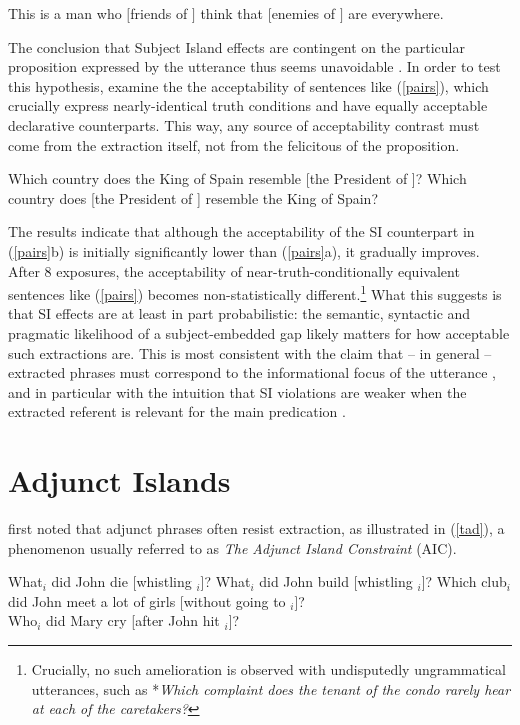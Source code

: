 \documentclass[output=paper]{langsci/langscibook}
\begin{document}
\ea
 This is a man who $[$friends of \spcs $]$
 think that $[$enemies of \spcs $]$ are everywhere.
 \z \label{symbd}

The conclusion that Subject Island effects are contingent on the particular proposition expressed by the utterance thus seems unavoidable \citep{chavesresp}. In order to test this hypothesis, \citet{chavesresp} examine the 
the acceptability of sentences like (\ref{pairs}), which crucially  express nearly-identical truth conditions and have equally acceptable declarative counterparts. This way, any source of acceptability contrast must come from the extraction itself, not from the felicitous of the proposition. 

\ea 
\ea Which country does the King of  Spain resemble [the President of \spcs]?
\ex Which country does [the President of \spcs] resemble  the King of Spain?
\z \label{pairs}
\z

\noindent
The results indicate that although the acceptability of the SI counterpart in (\ref{pairs}b)
is initially significantly lower than (\ref{pairs}a), it gradually improves.
After 8 exposures, the acceptability of near-truth-conditionally equivalent sentences like (\ref{pairs}) becomes non-statistically different.\footnote{Crucially, no such amelioration is observed with undisputedly ungrammatical
utterances, such as *\emph{Which complaint does the tenant of the condo rarely hear at each of the caretakers?}}
What this suggests is that SI effects are at least in part probabilistic: the semantic, syntactic and pragmatic
likelihood of a subject-embedded gap likely matters for how acceptable such extractions are. This is 
most consistent with the claim that -- in general -- extracted phrases must correspond to the informational focus
of the utterance  \citep{shir-jrn,valin86,kuno87,ken,Dean,goldberg13}, and in particular with the intuition that
SI violations are weaker when the extracted referent is relevant for the main predication \citep[495]{kluender06}.






\section{Adjunct Islands}

\citet{cattell} first noted that adjunct phrases  often resist extraction, 
as illustrated in  (\ref{tad}), a phenomenon usually referred to 
as \emph{The Adjunct Island Constraint} (AIC). 

\ea
\ea \bad{*}What$_i$ did John die [whistling \spc$_i$]? 
\ex \bad{*}What$_i$ did John build [whistling \spc$_i$]? 
\ex \bad{*}Which club$_i$ did John meet a lot of girls [without going to \spc$_i$]?\\
\citep[38]{cattell}
\ex \bad{*}Who$_i$ did Mary cry [after John hit \spc$_i$]?\\ 
\citep[503]{huang82}
\z  \label{tad}
\z
\end{document}
